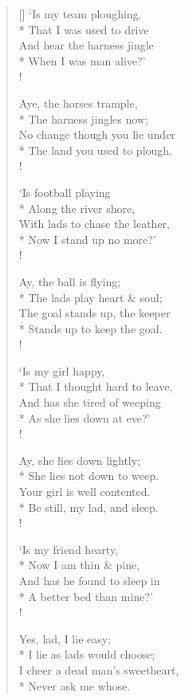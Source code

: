 \documentclass[MAIN]{subfiles}
\begin{document}
\settowidth{\versewidth}{`Is my team ploughing,}
\begin{verse}[\versewidth]
`Is my team ploughing,\\* 
\vin That I was used to drive\\
And hear the harness jingle\\* 
\vin When I was man alive?'\\!

Aye, the horses trample,\\*
\vin The harness jingles now;\\
No change though you lie under\\*
\vin The land you used to plough.\\!

`Is football playing\\*
\vin Along the river shore,\\
With lads to chase the leather,\\*
\vin Now I stand up no more?'\\!

Ay, the ball is flying;\\*
\vin The lads play heart \& soul;\\
The goal stands up, the keeper\\*
\vin Stands up to keep the goal.\\!

`Is my girl happy,\\*
\vin That I thought hard to leave,\\
And has she tired of weeping\\*
\vin As she lies down at eve?'\\!

Ay, she lies down lightly;\\*
\vin She lies not down to weep.\\
Your girl is well contented.\\*
\vin Be still, my lad, and sleep.\\!

`Is my friend hearty,\\*
\vin Now I am thin \& pine,\\
And has he found to sleep in\\*
\vin A better bed than mine?'\\!

Yes, lad, I lie easy;\\*
\vin I lie as lads would choose;\\
I cheer a dead man's sweetheart,\\*
\vin Never ask me whose.
\end{verse}
\end{document}
